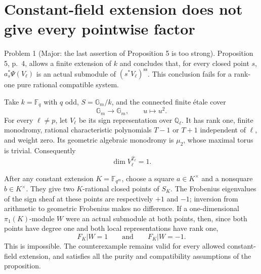 \documentclass[10pt]{article}
\begin{document}
\section*{Constant-field extension does not give every pointwise factor}
Problem 1 (Major: the last assertion of Proposition 5 is too strong).  Proposition 5, p. 4, allows a finite extension of \(k\) and concludes that, for every closed point \(s\), \(a_s^*\Psi(V_\ell)\) is an actual submodule of \((s^*V_\ell)^{\mathrm{ss}}\). This conclusion fails for a rank-one pure rational compatible system.\par
Take \(k=\mathbb F_q\) with \(q\) odd, \(S=\mathbb G_m/k\), and the connected finite étale cover \[\mathbb G_m\longrightarrow\mathbb G_m,\qquad u\longmapsto u^2.\] For every \(\ell\ne p\), let \(V_\ell\) be its sign representation over \(\mathbb Q_\ell\). It has rank one, finite monodromy, rational characteristic polynomials \(T-1\) or \(T+1\) independent of \(\ell\), and weight zero. Its geometric algebraic monodromy is \(\mu_2\), whose maximal torus is trivial. Consequently \[\dim V_\ell^{\overline T_\ell}=1.\]\par
After any constant extension \(K=\mathbb F_{q^m}\), choose a square \(a\in K^\times\) and a nonsquare \(b\in K^\times\). They give two \(K\)-rational closed points of \(S_K\). The Frobenius eigenvalues of the sign sheaf at these points are respectively \(+1\) and \(-1\); inversion from arithmetic to geometric Frobenius makes no difference. If a one-dimensional \(\pi_1(K)\)-module \(W\) were an actual submodule at both points, then, since both points have degree one and both local representations have rank one, \[F_K|W=1\qquad\text{and}\qquad F_K|W=-1.\] This is impossible. The counterexample remains valid for every allowed constant-field extension, and satisfies all the purity and compatibility assumptions of the proposition.\par
\end{document}
